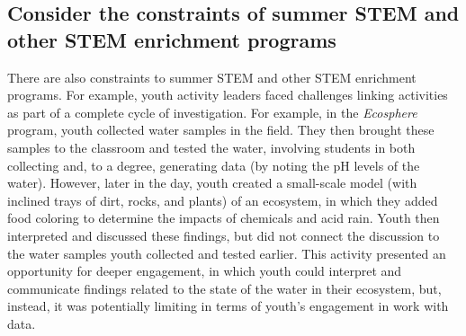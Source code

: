 \documentclass[]{book}
\theoremstyle{definition}
\theoremstyle{definition}
\theoremstyle{definition}
\theoremstyle{remark}
\begin{document}
\subsection{Consider the constraints of summer STEM and other STEM
enrichment
programs}\label{consider-the-constraints-of-summer-stem-and-other-stem-enrichment-programs}

There are also constraints to summer STEM and other STEM enrichment
programs. For example, youth activity leaders faced challenges linking
activities as part of a complete cycle of investigation. For example, in
the \emph{Ecosphere} program, youth collected water samples in the
field. They then brought these samples to the classroom and tested the
water, involving students in both collecting and, to a degree,
generating data (by noting the pH levels of the water). However, later
in the day, youth created a small-scale model (with inclined trays of
dirt, rocks, and plants) of an ecosystem, in which they added food
coloring to determine the impacts of chemicals and acid rain. Youth then
interpreted and discussed these findings, but did not connect the
discussion to the water samples youth collected and tested earlier. This
activity presented an opportunity for deeper engagement, in which youth
could interpret and communicate findings related to the state of the
water in their ecosystem, but, instead, it was potentially limiting in
terms of youth's engagement in work with data.
\end{document}
